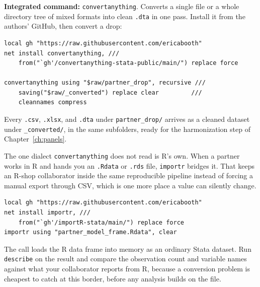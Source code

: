 \documentclass[
    a4paper,
    fontsize=10pt,
    twoside=true,
    numbers=noenddot,
]{kaobook}
\begin{document}
\begin{kaobox}[frametitle=Package Integration: \texttt{convertanything}]
\textbf{Integrated command:} \texttt{convertanything}. Converts a single file or a whole directory tree of mixed formats into clean \texttt{.dta} in one pass. Install it from the authors' GitHub, then convert a drop:
\par
{\footnotesize
\begin{verbatim}
local gh "https://raw.githubusercontent.com/ericabooth"
net install convertanything, ///
    from("`gh'/convertanything-stata-public/main/") replace force

convertanything using "$raw/partner_drop", recursive ///
    saving("$raw/_converted") replace clear         ///
    cleannames compress
\end{verbatim}
}
Every \texttt{.csv}, \texttt{.xlsx}, and \texttt{.dta} under \texttt{partner\_drop/} arrives as a cleaned dataset under \texttt{\_converted/}, in the same subfolders, ready for the harmonization step of Chapter~\ref{ch:panels}.
\end{kaobox}

The one dialect \texttt{convertanything} does not read is R's own. When a partner works in R and hands you an \texttt{.Rdata} or \texttt{.rds} file, \texttt{importr} bridges it. That keeps an R-shop collaborator inside the same reproducible pipeline instead of forcing a manual export through CSV, which is one more place a value can silently change.
\par
{\footnotesize
\begin{verbatim}
local gh "https://raw.githubusercontent.com/ericabooth"
net install importr, ///
    from("`gh'/importR-stata/main/") replace force
importr using "partner_model_frame.Rdata", clear
\end{verbatim}
}
The call loads the R data frame into memory as an ordinary Stata dataset. Run \texttt{describe} on the result and compare the observation count and variable names against what your collaborator reports from R, because a conversion problem is cheapest to catch at this border, before any analysis builds on the file.
\end{document}
